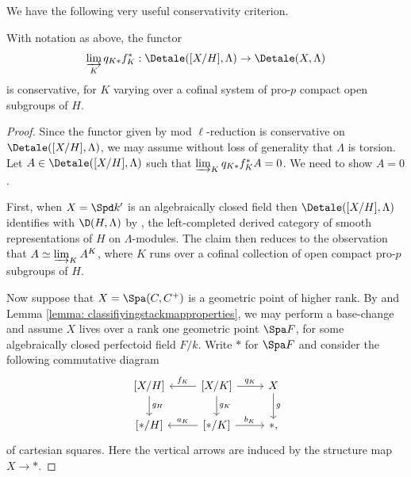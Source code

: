 \documentclass[letterpaper,11pt]{amsart}
\begin{document}
We have the following very useful conservativity criterion. 
\begin{lemma}{\label{lemma: conservativitylemma}}
With notation as above, the functor 
\[\varinjlim_Kq_{K*}f_{K}^{*}: \Detale([X/H], \Lambda)\to \Detale(X,\Lambda)\]
is conservative, for $K$ varying over a cofinal system of pro-$p$ compact open subgroups of $H$. 
\end{lemma}
\begin{proof}
Since the functor given by mod $\ell$-reduction is conservative on $\Detale([X/H], \Lambda)$, we may assume without loss of generality that $\Lambda$ is torsion. Let $A\in \Detale([X/H], \Lambda)$ such that $\varinjlim_Kq_{K*}f_{K}^{*}A=0$. We need to show $A=0$. 

First, when $X = \Spd k'$ is an algebraically closed field then $\Detale([X/H],\Lambda)$ identifies with $\D(H,\Lambda)$ by \cite[Theorem~V.1.1]{FSGeomLLC}, the left-completed derived category of smooth representations of $H$ on $\Lambda$-modules. The claim then reduces to the observation that $A \simeq \varinjlim_{K} A^{K}$, where $K$ runs over a cofinal collection of open compact pro-$p$ subgroups of $H$.

Now suppose that $X = \Spa(C,C^{+})$ is a geometric point of higher rank. By \cite[Theorem 19.5]{Ecod} and Lemma \ref{lemma: classifiyingstackmapproperties}, we may perform a base-change and assume $X$ lives over a rank one geometric point $\Spa F$, for some algebraically closed perfectoid field $F/k$. Write $\ast$ for $\Spa F$ and consider the following commutative diagram
\[
\begin{tikzcd}
     \left[X/H\right]\ar[d,"g_H"] & \left[X/K\right]\ar[l,"{f_{K}}",swap] \ar[r,"{q_{K}}", left] \ar[d,"g_K"]& X\ar[d,"g"]\\
     \left[\ast/H\right] & \left[\ast/K\right]\ar[l,"{a_K}",swap] \ar[r,"{b_K}", left] & \ast,
\end{tikzcd}
\]
of cartesian squares. Here the vertical arrows are induced by the structure map $X\to \ast$. 


\end{proof}
\end{document}
